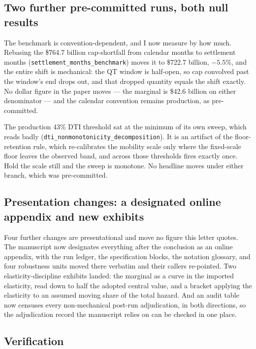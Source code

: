 \documentclass[11pt]{article}
\newcommand{\run}[1]{\texttt{#1}}
\begin{document}
\subsection{Two further pre-committed runs, both null results}

The benchmark is convention-dependent, and I now measure by how much. Rebasing the
\$764.7 billion cap-shortfall from calendar months to settlement months
(\run{settlement\_months\_benchmark}) moves it to \$722.7 billion, $-5.5$\%, and the
entire shift is mechanical: the QT window is half-open, so cap convolved past the
window's end drops out, and that dropped quantity equals the shift exactly. No dollar
figure in the paper moves --- the marginal is \$42.6 billion on either denominator ---
and the calendar convention remains production, as pre-committed.

The production 43\% DTI threshold sat at the minimum of its own sweep, which reads
badly (\run{dti\_nonmonotonicity\_decomposition}). It is an artifact of the
floor-retention rule, which re-calibrates the mobility scale only where the fixed-scale
floor leaves the observed band, and across those thresholds fires exactly once. Hold
the scale still and the sweep is monotone. No headline moves under either branch,
which was pre-committed.

\subsection{Presentation changes: a designated online appendix and new exhibits}

Four further changes are presentational and move no figure this letter quotes. The
manuscript now designates everything after the conclusion as an online appendix, with
the run ledger, the specification blocks, the notation glossary, and four robustness
units moved there verbatim and their callers re-pointed. Two elasticity-discipline
exhibits landed: the marginal as a curve in the imported elasticity, read down to
half the adopted central value, and a bracket applying the elasticity to an assumed
moving share of the total hazard. And an audit table now censuses every
non-mechanical post-run adjudication, in both directions, so the adjudication record
the manuscript relies on can be checked in one place.

\subsection{Verification}
\end{document}
